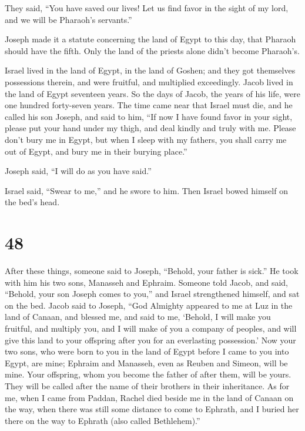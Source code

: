 They said, ``You have saved our lives! Let us find favor
in the sight of my lord, and we will be Pharaoh's servants.''

 Joseph made it a statute concerning the land of Egypt to
this day, that Pharaoh should have the fifth. Only the land of the
priests alone didn't become Pharaoh's.

 Israel lived in the land of Egypt, in the land of Goshen;
and they got themselves possessions therein, and were fruitful, and
multiplied exceedingly.  Jacob lived in the land of Egypt
seventeen years. So the days of Jacob, the years of his life, were one
hundred forty-seven years.  The time came near that Israel
must die, and he called his son Joseph, and said to him, ``If now I have
found favor in your sight, please put your hand under my thigh, and deal
kindly and truly with me. Please don't bury me in Egypt, 
but when I sleep with my fathers, you shall carry me out of Egypt, and
bury me in their burying place.''

Joseph said, ``I will do as you have said.''

 Israel said, ``Swear to me,'' and he swore to him. Then
Israel bowed himself on the bed's head.

\hypertarget{section-47}{%
\section{48}\label{section-47}}

 After these things, someone said to Joseph, ``Behold, your
father is sick.'' He took with him his two sons, Manasseh and Ephraim.
 Someone told Jacob, and said, ``Behold, your son Joseph
comes to you,'' and Israel strengthened himself, and sat on the bed.
 Jacob said to Joseph, ``God Almighty appeared to me at Luz
in the land of Canaan, and blessed me,  and said to me,
`Behold, I will make you fruitful, and multiply you, and I will make of
you a company of peoples, and will give this land to your offspring
after you for an everlasting possession.'  Now your two
sons, who were born to you in the land of Egypt before I came to you
into Egypt, are mine; Ephraim and Manasseh, even as Reuben and Simeon,
will be mine.  Your offspring, whom you become the father of
after them, will be yours. They will be called after the name of their
brothers in their inheritance.  As for me, when I came from
Paddan, Rachel died beside me in the land of Canaan on the way, when
there was still some distance to come to Ephrath, and I buried her there
on the way to Ephrath (also called Bethlehem).''


